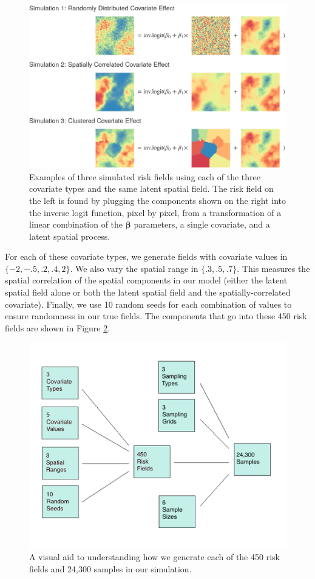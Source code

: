 \documentclass{article}
\begin{document}
\begin{figure}[ht]
    \centering
    \includegraphics[width=.7\textwidth]{./figures/covariateeffects.png}
    \caption{Examples of three simulated risk fields using each of the three covariate types and the same latent spatial field. The risk field on the left is found by plugging the components shown on the right into the inverse logit function, pixel by pixel, from a transformation of a linear combination of the $\boldsymbol{\beta}$ parameters, a single covariate, and a latent spatial process.}
    \label{fig:simPlot}
\end{figure} 

For each of these covariate types, we generate fields with covariate values in $\{-2, -.5, .2, .4, 2\}$. We also vary the spatial range in $\{.3, .5, .7\}$. This measures the spatial correlation of the spatial components in our model (either the latent spatial field alone or both the latent spatial field and the spatially-correlated  covariate). Finally, we use 10 random seeds for each combination of values to ensure randomness in our true fields. The components that go into these 450 risk fields are shown in Figure \ref{fig:parPlot}.

 \begin{figure}[ht]
    \centering
    \includegraphics[width=.7\textwidth]{./figures/samplingexplained.png}
    \caption{A visual aid to understanding how we generate each of the 450 risk fields and 24,300 samples in our simulation.}
    \label{fig:parPlot}
\end{figure}
\end{document}
